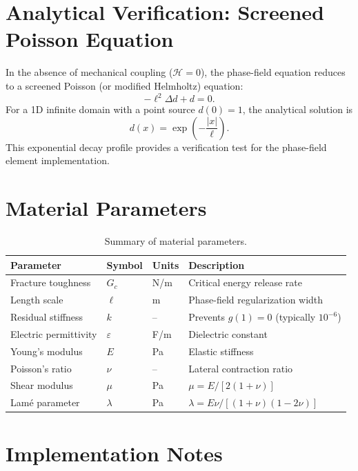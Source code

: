 \documentclass[11pt,a4paper]{article}
\begin{document}
\section{Analytical Verification: Screened Poisson Equation}

In the absence of mechanical coupling ($\mathcal{H} = 0$), the phase-field equation reduces to a screened Poisson (or modified Helmholtz) equation:
\begin{equation}
    -\ell^2 \Delta d + d = 0.
\end{equation}
For a 1D infinite domain with a point source $d(0) = 1$, the analytical solution is
\begin{equation}
    d(x) = \exp\!\left(-\frac{|x|}{\ell}\right).
\end{equation}
This exponential decay profile provides a verification test for the phase-field element implementation.

\section{Material Parameters}

\begin{table}[h]
\centering
\begin{tabular}{llll}
\toprule
Parameter & Symbol & Units & Description \\
\midrule
Fracture toughness & $G_c$ & N/m & Critical energy release rate \\
Length scale & $\ell$ & m & Phase-field regularization width \\
Residual stiffness & $k$ & -- & Prevents $g(1) = 0$ (typically $10^{-6}$) \\
Electric permittivity & $\varepsilon$ & F/m & Dielectric constant \\
Young's modulus & $E$ & Pa & Elastic stiffness \\
Poisson's ratio & $\nu$ & -- & Lateral contraction ratio \\
Shear modulus & $\mu$ & Pa & $\mu = E/[2(1+\nu)]$ \\
Lam\'{e} parameter & $\lambda$ & Pa & $\lambda = E\nu/[(1+\nu)(1-2\nu)]$ \\
\bottomrule
\end{tabular}
\caption{Summary of material parameters.}
\end{table}

\section{Implementation Notes}
\end{document}
